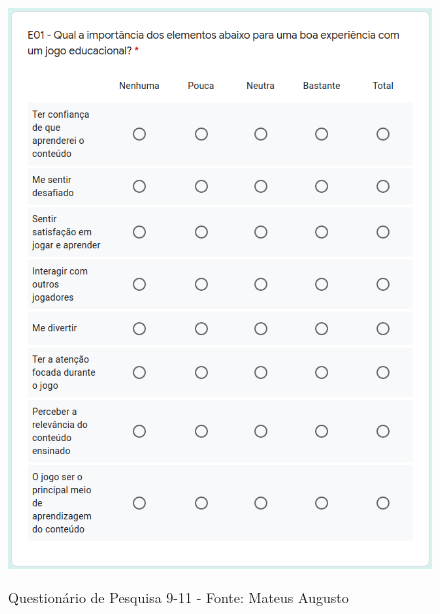 \begin{apendicesenv}
\begin{figure}[htbp]
{        \includegraphics[keepaspectratio=true,scale=1.25]{figuras/apendice/survey10.png}
        \label{Fig:survey_pt10.png}
    }
    \quad
   
	\caption{\textcolor{textmodified}{Questionário de Pesquisa 9-11 - Fonte: Mateus Augusto}}
	\label{Fig:survey3.png}
\end{figure}


\end{apendicesenv}

